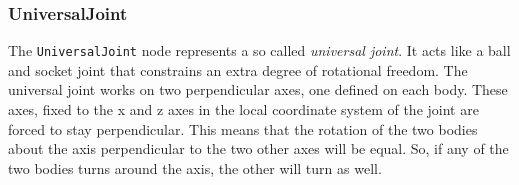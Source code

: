 \subsubsection{UniversalJoint}

The \texttt{UniversalJoint} node represents a so called
\emph{universal joint}. It acts like a ball and socket joint that
constrains an extra degree of rotational freedom. The universal joint
works on two perpendicular axes, one defined on each body. These axes,
fixed to the x and z axes in the local coordinate system of the joint
are forced to stay perpendicular. This means that the rotation of the
two bodies about the axis perpendicular to the two other axes will be
equal. So, if any of the two bodies turns around the axis, the other
will turn as well.



